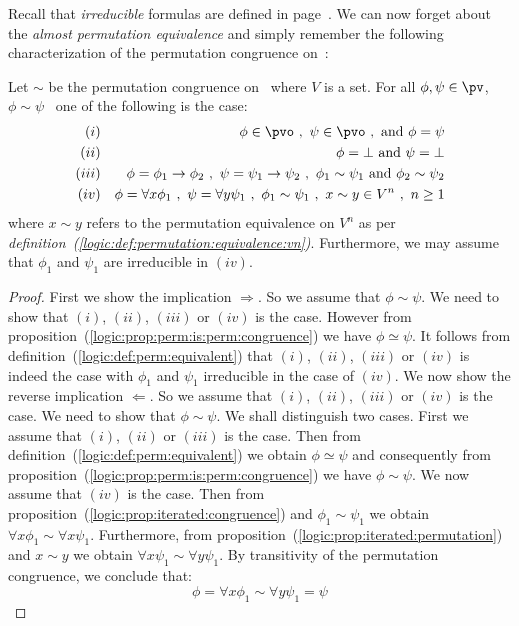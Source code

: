 Recall that {\em irreducible} formulas are defined in
page~\pageref{logic:def:irreducible:formula}. We can now forget
about the {\em almost permutation equivalence} and simply remember
the following characterization of the permutation congruence on
\pv\,:
\begin{theorem}\label{logic:the:perm:congruence:charac}
Let $\sim$ be the permutation congruence on \pv\ where $V$ is a set.
For all $\phi,\psi\in\pv$, $\phi\sim\psi$ \ifand\ one of the
following is the case:
    \begin{eqnarray*}
    (i)&&\phi\in\pvo\ ,\ \psi\in\pvo\ ,\ \mbox{and}\ \phi=\psi\\
    (ii)&&\phi=\bot\ \mbox{and}\ \psi=\bot\\
    (iii)&&\phi=\phi_{1}\to\phi_{2}\ ,\ \psi=\psi_{1}\to\psi_{2}\ ,\
    \phi_{1}\sim\psi_{1}\ \mbox{and}\ \phi_{2}\sim\psi_{2}\\
    (iv)&&\phi=\forall x\phi_{1}\ ,\ \psi=\forall y\psi_{1}\ ,\
    \phi_{1}\sim\psi_{1}\ ,\ x\sim y\in V^{n}\ ,\ n\geq 1
    \end{eqnarray*}
where $x\sim y$ refers to the permutation equivalence on $V^{n}$ as
per {\em definition~(\ref{logic:def:permutation:equivalence:vn})}.
Furthermore, we may assume that $\phi_{1}$ and $\psi_{1}$ are
irreducible in $(iv)$.
\end{theorem}
\begin{proof}
First we show the implication $\Rightarrow$. So we assume that
$\phi\sim\psi$. We need to show that $(i)$, $(ii)$, $(iii)$ or
$(iv)$ is the case. However from
proposition~(\ref{logic:prop:perm:is:perm:congruence}) we have
$\phi\simeq\psi$. It follows from
definition~(\ref{logic:def:perm:equivalent}) that $(i)$, $(ii)$,
$(iii)$ or $(iv)$ is indeed the case with $\phi_{1}$ and $\psi_{1}$
irreducible in the case of $(iv)$. We now show the reverse
implication $\Leftarrow$. So we assume that $(i)$, $(ii)$, $(iii)$
or $(iv)$  is the case. We need to show that $\phi\sim\psi$. We
shall distinguish two cases. First we assume that $(i)$, $(ii)$ or
$(iii)$ is the case. Then from
definition~(\ref{logic:def:perm:equivalent}) we obtain
$\phi\simeq\psi$ and consequently from
proposition~(\ref{logic:prop:perm:is:perm:congruence}) we have
$\phi\sim\psi$. We now assume that $(iv)$ is the case. Then from
proposition~(\ref{logic:prop:iterated:congruence}) and
$\phi_{1}\sim\psi_{1}$ we obtain $\forall x\phi_{1}\sim\forall
x\psi_{1}$. Furthermore, from
proposition~(\ref{logic:prop:iterated:permutation}) and $x\sim y$ we
obtain $\forall x\psi_{1}\sim\forall y\psi_{1}$. By transitivity of
the permutation congruence, we conclude that:
    \[
    \phi=\forall x\phi_{1}\sim\forall y\psi_{1}=\psi
    \]
\end{proof}
